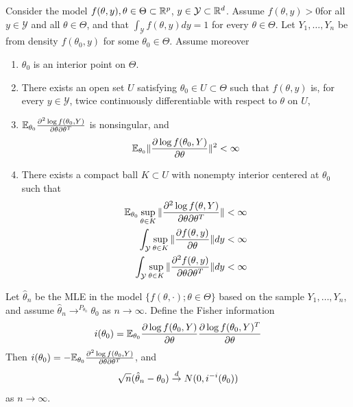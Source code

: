 \begin{thm}
  Consider the model $f(\theta, y), \theta \in \Theta \subset \mathbb{R}^{p}$,
  $y \in \mathcal{Y} \subset \mathbb{R}^{d}$.  Assume $f(\theta, y) > 0$for
  all $y \in \mathcal{Y}$ and all $\theta \in \Theta$, and that
  $\int_{\mathcal{Y}} f(\theta, y) dy = 1$  for every $\theta \in
  \Theta$. Let $Y_{1}, \dots, Y_{n}$ be \iid from density
  $f(\theta_{0}, y)$ for some $\theta_{0} \in \Theta$.  Assume moreover
  \begin{enumerate}
  \item $\theta_{0}$ is an interior point on $\Theta$.
  \item There exists an open set $U$ satisfying $\theta_{0} \in U
    \subset \Theta$ such that $f(\theta, y)$ is, for every $y \in
    \mathcal{Y}$, twice continuously differentiable with respect to
    $\theta$ on $U$,
  \item $\E_{\theta_{0}} \frac{\partial^{2} \log f(\theta_{0},
      Y)}{\partial \theta \partial \theta^{T}} $ is nonsingular, and
    \begin{equation}
      \label{eq:3}
      \E_{\theta_{0}} \| \frac{\partial \log f(\theta_{0},
        Y)}{\partial \theta} \|^{2}  < \infty
    \end{equation}
  \item There exists a compact ball $K \subset U$ with nonempty
    interior centered at $\theta_{0}$ such that
    \begin{align}
      \label{eq:7}
      \E_{\theta_{0}} \sup_{\theta \in K} \| \frac{\partial^{2} \log
        f(\theta, Y)}{\partial \theta \partial \theta^{T}} \| < \infty \\
      \int_{\mathcal{Y}}^{} \sup_{\theta \in K} \| \frac{\partial
        f(\theta, y)}{\partial \theta}  \| dy < \infty \\
      \label{eq:14}
      \int_{\mathcal{Y}}^{} \sup_{\theta \in K} \| \frac{\partial^{2}
        f(\theta, y)}{\partial \theta \partial \theta^{T}}  \| dy < \infty
    \end{align}
  \end{enumerate}

  Let $\hat \theta_{n}$ be the MLE in the model $\{ f(\theta, \cdot);
  \theta \in \Theta \} $ based on the sample $Y_{1}, \dots, Y_{n}$,
  and assume $\hat \theta_{n} \rightarrow^{P_{\theta_{0}}} \theta_{0}$
  as $n \rightarrow \infty$.  Define the Fisher information
  \begin{align}
    \label{eq:15}
    i(\theta_{0}) = \E_{\theta_{0}} \frac{\partial \log f(\theta_{0},
      Y)}{\partial \theta} \frac{\partial \log f(\theta_{0},
      Y)^{T}}{\partial \theta}
  \end{align}
  Then $i(\theta_{0})= - \E_{\theta_{0}} \frac{\partial^{2} \log
    f(\theta_{0}, Y)}{\partial \theta \partial \theta^{T}}$, and
  \begin{align}
    \label{eq:16}
    \sqrt{n} (\hat \theta_{n} - \theta_{0}) \overset{d}{\rightarrow} N(0, i^{-i}(\theta_{0}))
  \end{align} as $n \rightarrow \infty$.
\end{thm}

